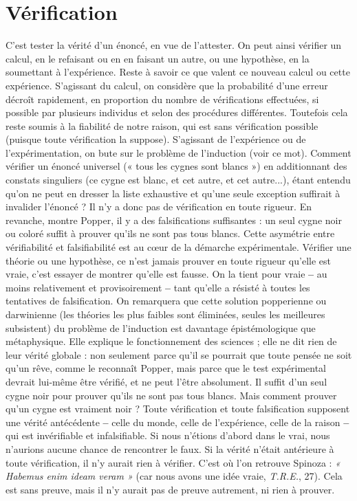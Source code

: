 \section{Vérification}
C’est tester la vérité d’un énoncé, en vue de l’attester. On
peut ainsi vérifier un calcul, en le refaisant ou en en faisant
un autre, ou une hypothèse, en la soumettant à l'expérience. Reste à savoir ce
que valent ce nouveau calcul ou cette expérience. S'agissant du calcul, on considère
que la probabilité d’une erreur décroît rapidement, en proportion du
nombre de vérifications effectuées, si possible par plusieurs individus et selon
des procédures différentes. Toutefois cela reste soumis à la fiabilité de notre
raison, qui est sans vérification possible (puisque toute vérification la suppose).
S'agissant de l'expérience ou de l’expérimentation, on bute sur le problème de
l'induction (voir ce mot). Comment vérifier un énoncé universel (« tous les
cygnes sont blancs ») en additionnant des constats singuliers (ce cygne est
blanc, et cet autre, et cet autre...), étant entendu qu’on ne peut en dresser la
liste exhaustive et qu’une seule exception suffirait à invalider l'énoncé ? Il n’y a
donc pas de vérification en toute rigueur. En revanche, montre Popper, il y a
des falsifications suffisantes : un seul cygne noir ou coloré suffit à prouver qu’ils
ne sont pas tous blancs. Cette asymétrie entre vérifiabilité et falsifiabilité est au
cœur de la démarche expérimentale. Vérifier une théorie ou une hypothèse, ce
n’est jamais prouver en toute rigueur qu’elle est vraie, c’est essayer de montrer
qu’elle est fausse. On la tient pour vraie {\bf --} au moins relativement et provisoirement
{\bf --} tant qu'elle a résisté à toutes les tentatives de falsification. On remarquera
que cette solution popperienne ou darwinienne (les théories les plus
faibles sont éliminées, seules les meilleures subsistent) du problème de l’induction
est davantage épistémologique que métaphysique. Elle explique le fonctionnement
des sciences ; elle ne dit rien de leur vérité globale : non seulement
parce qu’il se pourrait que toute pensée ne soit qu’un rêve, comme le reconnaît
Popper, mais parce que le test expérimental devrait lui-même être vérifié, et ne
peut l’être absolument. Il suffit d’un seul cygne noir pour prouver qu’ils ne
sont pas tous blancs. Mais comment prouver qu’un cygne est vraiment noir ?
Toute vérification et toute falsification supposent une vérité antécédente {\bf --} celle
du monde, celle de l'expérience, celle de la raison {\bf --} qui est invérifiable et infalsifiable.
Si nous n’étions d’abord dans le vrai, nous n’aurions aucune chance de
rencontrer le faux. Si la vérité n’était antérieure à toute vérification, il n’y aurait
rien à vérifier. C’est où l’on retrouve Spinoza : {\it « Habemus enim ideam veram »}
(car nous avons une idée vraie, {\it T.R.E.}, 27). Cela est sans preuve, mais il n’y
aurait pas de preuve autrement, ni rien à prouver.

